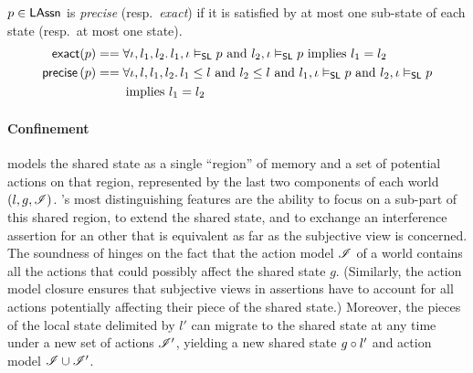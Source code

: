 
\begin{definition}
  $p\in\mathsf{LAssn}$ is \emph{precise} (resp.\ \emph{exact}) if it is
  satisfied by at most one sub-state of each state (resp.\ at most one
  state).
  \begin{align*}
    \textsf{exact}(p) &==
    \forall \iota, l_1, l_2.\, l_1, \iota \mathrel{\vDash_{\mathsf{SL}}} p\text{ and }l_2, \iota
    \mathrel{\vDash_{\mathsf{SL}}} p\text{ implies } l_1 = l_2\\
    \textsf{precise} \left( p \right) &==
    \forall \iota, l, l_1, l_2.\, l_1\leq l\text{ and }l_2\leq l\text{ and }l_1, \iota \mathrel{\vDash_{\mathsf{SL}}} p\text{ and }l_2, \iota
    \mathrel{\vDash_{\mathsf{SL}}} p\\
    &\qquad\text{ implies } l_1 = l_2
  \end{align*}
\end{definition}

\paragraph{Confinement}
\colosl models the shared state as a single ``region'' of memory and a
set of potential actions on that region, represented by the last two
components of each world $(l,g,\mathscr{I})$. \colosl's most
distinguishing features are the ability to focus on a sub-part of this
shared region, to extend the shared state, and to exchange an
interference assertion for an other that is equivalent as far as the
subjective view is concerned. The soundness of \colosl hinges on the
fact that the action model $\mathscr{I}$ of a world contains all the actions
that could possibly affect the shared state $g$. (Similarly, the
action model closure ensures that subjective views in assertions have
to account for all actions potentially affecting their piece of the shared
state.) Moreover, the pieces of the local state delimited by $l'$ can migrate to
the shared state at any time under a new set of actions $\mathscr{I}'$,
yielding a new shared state $g\circ l'$ and action model $\mathscr{I}
\cup \mathscr{I}'$.

